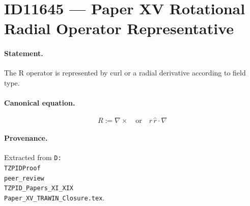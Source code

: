 \section*{ID11645 --- Paper XV Rotational Radial Operator Representative}

\paragraph{Statement.}
The R operator is represented by curl or a radial derivative according to field type.

\paragraph{Canonical equation.}
\[
R:=\nabla\times\quad\mathrm{or}\quad r\,\hat r\cdot\nabla
\]

\paragraph{Provenance.}
Extracted from \texttt{D:\\TZPIDProof\\peer\_review\\TZPID\_Papers\_XI\_XIX\\Paper\_XV\_TRAWIN\_Closure.tex}.
